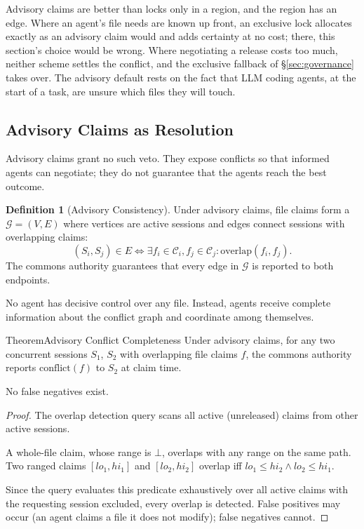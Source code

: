 \documentclass[11pt,a4paper]{article}
\theoremstyle{definition}
\newtheorem{definition}{Definition}[section]
\theoremstyle{remark}
\begin{document}
Advisory claims are better than locks only in a region, and the region has an edge. Where an agent's file needs are known up front, an exclusive lock allocates exactly as an advisory claim would and adds certainty at no cost; there, this section's choice would be wrong. Where negotiating a release costs too much, neither scheme settles the conflict, and the exclusive fallback of \S\ref{sec:governance} takes over. The advisory default rests on the fact that LLM coding agents, at the start of a task, are unsure which files they will touch.


\subsection{Advisory Claims as Resolution}\label{sec:advisory}

Advisory claims grant no such veto. They expose conflicts so that informed agents can negotiate; they do not guarantee that the agents reach the best outcome.

\begin{definition}[Advisory Consistency]\label{def:advisory}
\setlength{\parskip}{4pt plus 1pt}
Under advisory claims, file claims form a  $\mathcal{G} = (V, E)$ where vertices are active sessions and edges connect sessions with overlapping claims:
\[
(S_i, S_j) \in E \iff \exists f_i \in \mathcal{C}_i, f_j \in \mathcal{C}_j : \text{overlap}(f_i, f_j).
\]
The commons authority guarantees that every edge in $\mathcal{G}$ is reported to both endpoints.

No agent has decisive control over any file. Instead, agents receive complete information about the conflict graph and coordinate among themselves.
\end{definition}

\begin{pdclaim}{Theorem}{Advisory Conflict Completeness}
\setlength{\parskip}{4pt plus 1pt}
\label{thm:advisory}
Under advisory claims, for any two concurrent sessions $S_1$, $S_2$ with overlapping file claims $f$, the commons authority reports $\text{conflict}(f)$ to $S_2$ at claim time.

No false negatives exist.
\end{pdclaim}

\begin{proof}
\setlength{\parskip}{4pt plus 1pt}
The overlap detection query scans all active (unreleased) claims from other active sessions.

A whole-file claim, whose range is $\bot$, overlaps with any range on the same path. Two ranged claims $[\mathit{lo}_1,\mathit{hi}_1]$ and $[\mathit{lo}_2,\mathit{hi}_2]$ overlap iff $\mathit{lo}_1 \leq \mathit{hi}_2 \land \mathit{lo}_2 \leq \mathit{hi}_1$.

Since the query evaluates this predicate exhaustively over all active claims with the requesting session excluded, every overlap is detected. False positives may occur (an agent claims a file it does not modify); false negatives cannot.
\end{proof}
\end{document}

